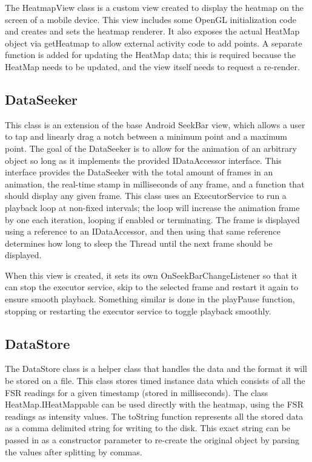 The HeatmapView class is a custom view created to display the heatmap on the screen of a mobile device. This view includes some OpenGL initialization code and creates and sets the heatmap renderer. It also exposes the actual HeatMap object via getHeatmap to allow external activity code to add points. A separate function is added for updating the HeatMap data; this is required because the HeatMap needs to be updated, and the view itself needs to request a re-render.
\subsection{DataSeeker}
This class is an extension of the base Android SeekBar view, which allows a user to tap and linearly drag a notch between a minimum point and a maximum point. The goal of the DataSeeker is to allow for the animation of an arbitrary object so long as it implements the provided IDataAccessor interface. This interface provides the DataSeeker with the total amount of frames in an animation, the real-time stamp in milliseconds of any frame, and a function that should display any given frame. This class uses an ExecutorService to run a playback loop at non-fixed intervals; the loop will increase the animation frame by one each iteration, looping if enabled or terminating. The frame is displayed using a reference to an IDataAccessor, and then using that same reference determines how long to sleep the Thread until the next frame should be displayed. 

When this view is created, it sets its own OnSeekBarChangeListener so that it can stop the executor service, skip to the selected frame and restart it again to ensure smooth playback. Something similar is done in the playPause function, stopping or restarting the executor service to toggle playback smoothly.
\subsection{DataStore}
The DataStore class is a helper class that handles the data and the format it will be stored on a file. This class stores timed instance data which consists of all the FSR readings for a given timestamp (stored in milliseconds). The class HeatMap.IHeatMappable can be used directly with the heatmap, using the FSR readings as intensity values. The toString function represents all the stored data as a comma delimited string for writing to the disk. This exact string can be passed in as a constructor parameter to re-create the original object by parsing the values after splitting by commas.
